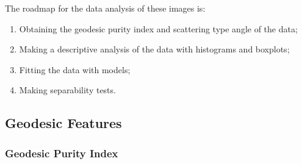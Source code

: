 \documentclass[journal]{IEEEtran}
\begin{document}
The roadmap for the data analysis of these images is:
\begin{enumerate}
  \item Obtaining the geodesic purity index and scattering type angle of the data;
  \item Making a descriptive analysis of the data with histograms and boxplots;
  \item Fitting the data with models;
  \item Making separability tests.
\end{enumerate}

\subsection{Geodesic Features}

\subsubsection{Geodesic Purity Index}

% 

\end{document}
